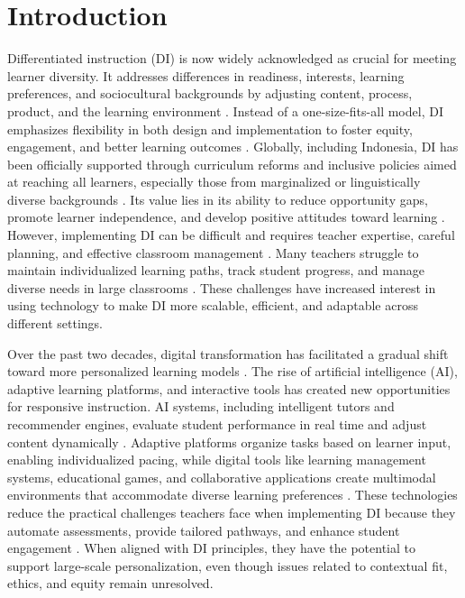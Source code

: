 \documentclass[english]{textolivre}
\begin{document}
\section{Introduction}\label{sec-intro}
Differentiated instruction (DI) is now widely acknowledged as crucial for meeting learner diversity. It addresses differences in readiness, interests, learning preferences, and sociocultural backgrounds by adjusting content, process, product, and the learning environment \cite{tomlinson2001, tomlinson2014}. Instead of a one-size-fits-all model, DI emphasizes flexibility in both design and implementation to foster equity, engagement, and better learning outcomes \cite{ferrer2025, puzio2020, ramaila2025, sabir2024}. Globally, including Indonesia, DI has been officially supported through curriculum reforms and inclusive policies aimed at reaching all learners, especially those from marginalized or linguistically diverse backgrounds \cite{marlina2019, ouyang2023, smalejacobse2019}. Its value lies in its ability to reduce opportunity gaps, promote learner independence, and develop positive attitudes toward learning \cite{cullen2024, donald2022, saad2025}. However, implementing DI can be difficult and requires teacher expertise, careful planning, and effective classroom management \cite{maulana2019, vangeel2019}. Many teachers struggle to maintain individualized learning paths, track student progress, and manage diverse needs in large classrooms \cite{cevikbas2022, darlinghammond2020,kariippanon2019, kerimbayev2025, tetzlaff2020}. These challenges have increased interest in using technology to make DI more scalable, efficient, and adaptable across different settings.

Over the past two decades, digital transformation has facilitated a gradual shift toward more personalized learning models \cite{engelbrecht2020, menaguacas2025, shemshack2020, tetzlaff2020}. The rise of artificial intelligence (AI), adaptive learning platforms, and interactive tools has created new opportunities for responsive instruction. AI systems, including intelligent tutors and recommender engines, evaluate student performance in real time and adjust content dynamically \cite{gligorea2023, naseer2024, sajja2024, sayed2022, taskin2025}. Adaptive platforms organize tasks based on learner input, enabling individualized pacing, while digital tools like learning management systems, educational games, and collaborative applications create multimodal environments that accommodate diverse learning preferences \cite{jose2024, strielkowski2024, vincentruz2022, wang2020}. These technologies reduce the practical challenges teachers face when implementing DI because they automate assessments, provide tailored pathways, and enhance student engagement \cite{krishan2023, palieraki2021, vaganova2020}. When aligned with DI principles, they have the potential to support large-scale personalization, even though issues related to contextual fit, ethics, and equity remain unresolved.
\end{document}
